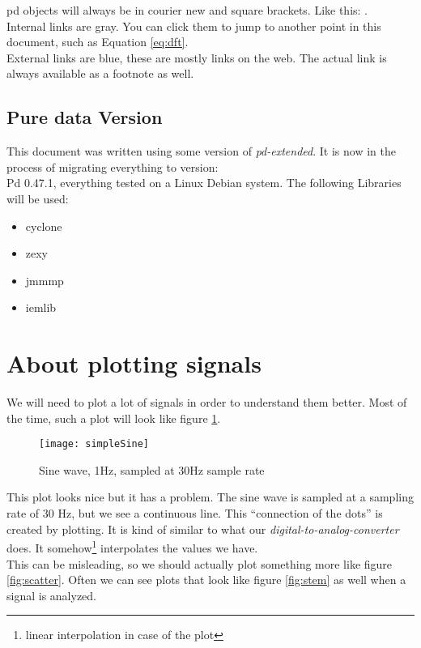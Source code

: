 
pd objects will always be in courier new and square brackets. Like this: .\\

Internal links are gray. You can click them to jump to another point in this document, such as Equation \ref{eq:dft}.\\

External links are blue, these are mostly links on the web. The actual link is always available as a footnote as well. 

\subsection{Pure data Version}
This document was written using some version of \textit{pd-extended}. It is now in the process of migrating everything to version:\\
Pd 0.47.1, everything tested on a Linux Debian system.
The following Libraries will be used:
\begin{itemize}
	\item cyclone
	\item zexy
	\item jmmmp
	\item iemlib
\end{itemize}

\section{About plotting signals}

We will need to plot a lot of signals in order to understand them better. Most of the time, such a plot will look like figure \ref{fig:simpeSine}.

\begin{figure}[h!]
	\centering
	\texttt{[image: simpleSine]}
	\caption[simple sine plot]
	{Sine wave, 1Hz, sampled at 30Hz sample rate}
	\label{fig:simpeSine}
\end{figure}

This plot looks nice but it has a problem. The sine wave is sampled at a sampling rate of 30 Hz, but we see a continuous line. This ``connection of the dots'' is created by plotting. It is kind of similar to what our \textit{digital-to-analog-converter} does. It somehow\footnote{linear interpolation in case of the plot} interpolates the values we have. \\
This can be misleading, so we should actually plot something more like figure \ref{fig:scatter}. Often we can see plots that look like figure \ref{fig:stem} as well when a signal is analyzed.

